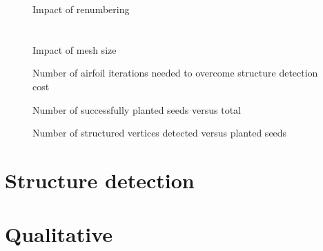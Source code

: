\begin{figure}[h]
  \centering
  
\caption{Impact of renumbering}
\label{fig:plot-airfoil-numbering}
\end{figure}


\section{}

\begin{figure}[h]
  \centering
  
\caption{Impact of mesh size}
\label{fig:plot-airfoil-size-runtime}
\end{figure}


\begin{figure}[h]
  \centering
  
\caption{Number of airfoil iterations needed to overcome structure detection cost}
\label{fig:plot-airfoil-iterations}
\end{figure}



\begin{figure}[h]
  \centering
  
\caption{Number of successfully planted seeds versus total}
\label{fig:plot-naac0012-failedseeds-over-seeds}
\end{figure}


\begin{figure}[h]
  \centering
  
\caption{Number of structured vertices detected versus planted seeds}
\label{fig:plot-naca0012-structure-over-seeds}
\end{figure}




\section{Structure detection}


\section{Qualitative}


